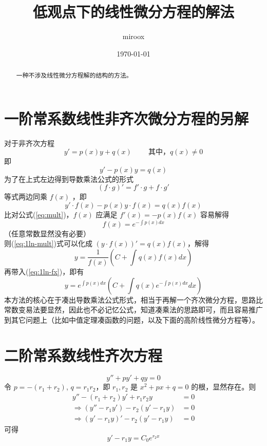 \documentclass[UTF8]{ctexart}
\title{低观点下的线性微分方程的解法}
\author{miroox}
\date{\today}
\newcommand\mathe{\mathit{e}}
\begin{document}
\maketitle
\begin{abstract} 
一种不涉及线性微分方程解的结构的方法。
\end{abstract} 

\section{一阶常系数线性非齐次微分方程的另解} \label{sec:1ln}
	对于非齐次方程
	\begin{equation}
		y'=p(x)y+q(x)\phantom{xxxx} \text{其中，} q(x)\neq 0 \label{eq:1ln-org}
	\end{equation}
	即
	\begin{equation}
		y'-p(x)y=q(x) \label{eq:1ln-mov}
	\end{equation}
	为了在上式左边得到导数乘法公式的形式 
	\begin{equation}
		(f\cdot g)'=f'\cdot g+f\cdot g' \label{eq:mult}
	\end{equation}
	等式两边同乘 $f(x)$ ，即
	\begin{equation}
		y'\cdot f(x)-p(x)y\cdot f(x)=q(x)f(x) \label{eq:1ln-mult}
	\end{equation}
	比对公式(\ref{eq:mult})，$f(x)$ 应满足 $f'(x)=-p(x)f(x)$
	容易解得
	\begin{equation}
		f(x)=\mathe^{-\int p(x)dx} \label{eq:1ln-fx}
	\end{equation}
	（任意常数显然没有必要） \\
	则(\ref{eq:1ln-mult})式可以化成 $(y\cdot f(x))'=q(x)f(x)$，解得
	\begin{equation}
		y=\frac{1}{f(x)}(C+\int q(x)f(x)dx) \label{eq:1ln-yNoExpand}
	\end{equation}
	再带入(\ref{eq:1ln-fx})，即有
	\begin{equation}
		y=\mathe^{\int p(x)dx}(C+\int q(x)\mathe^{-\int p(x)dx}dx) \label{eq:1ln-result}
	\end{equation}
	本方法的核心在于凑出导数乘法公式形式，相当于再解一个齐次微分方程，思路比常数变易法要显然，因此也不必记忆公式，知道凑乘法的思路即可，而且容易推广到其它问题上（比如中值定理凑函数的问题，以及下面的高阶线性微分方程等）。

\section{二阶常系数线性齐次方程} \label{sec:2lh}
	\begin{equation}
		y''+py'+qy=0
	\end{equation}
	令 $p=-(r_{1}+r_{2})$, $q=r_{1}r_{2}$，即 $r_{1}, r_{2}$ 是 $x^{2}+px+q=0$ 的根，显然存在。则
	\begin{align}
		  y''-(r_{1}+r_{2})y'+r_{1}r_{2}y&=0 \label{eq:2lh-repr} \\
		\Rightarrow (y''-r_{1}y')-r_{2}(y'-r_{1}y)&=0 \\
		\Rightarrow (y'-r_{1}y)'-r_{2}(y'-r_{1}y)&=0
	\end{align}
	可得
	\begin{equation}
		y'-r_{1}y=C_{0}\mathe^{r_{2}x} \label{eq:2lh-1stInt}
	\end{equation}
\end{document}
